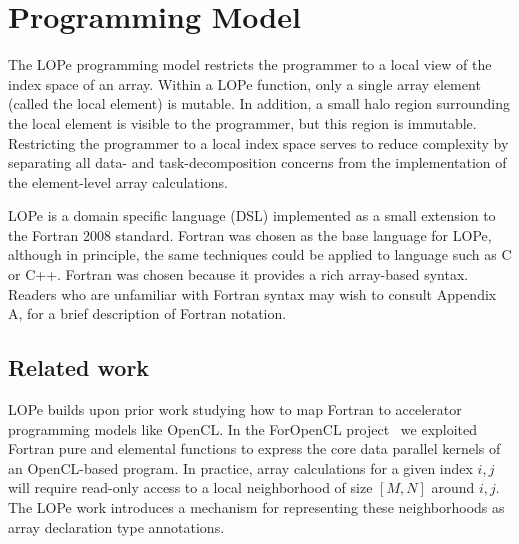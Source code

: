 \section{Programming Model}

The LOPe programming model
restricts the programmer to a local view of the index
space of an array.  Within a LOPe function, only a single array
element (called the local element) is mutable.  In addition, a small
halo region surrounding the local element is visible to the
programmer, but this region is immutable.  Restricting the programmer
to a local index space serves to reduce complexity by separating all
data- and task-decomposition concerns from the implementation of the
element-level array calculations.


LOPe is a domain specific language (DSL) implemented as a small extension
to the Fortran 2008 standard.
Fortran was chosen as the base language for LOPe, although in
principle, the same techniques could be applied to language such as C
or C++.  Fortran was chosen because it provides a
rich array-based syntax.  Readers who are unfamiliar with Fortran
syntax may wish to consult Appendix A, for a brief description of
Fortran notation.

\subsection{Related work}

LOPe builds upon prior work studying how to map Fortran to accelerator
programming models like OpenCL.  In the ForOpenCL project~\cite{foropencl}
we exploited Fortran pure and elemental functions to express the core
data parallel kernels of an OpenCL-based program.  In practice, array
calculations for a given index $i,j$ will require read-only access to
a local neighborhood of size $[M,N]$ around $i,j$.  The LOPe work introduces
a mechanism for representing these neighborhoods as array declaration
type annotations.

